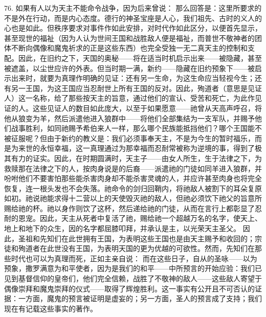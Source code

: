 76. 如果有人以为天主不能命令战争，因为后来曾说： 那么回答是：这里所要求的不是外在行动，而是内心态度。德行的神圣宝座是人心，我们祖先、古时的义人的心也是如此。但秩序要求对事件作如此安排，对时代作如此区分，以便首先显示，甚至现世的福祉（因为人认为世间王国和战胜敌人便是福祉，而普世不敬神者的团体不断向偶像和魔鬼祈求的正是这些东西）也完全受独一无二真天主的控制和支配。因此，在旧约之下，天国的奥秘——将在适当时机启示出来——被隐藏，甚至被遮盖，以尘世应许的外表。但当时期一满，新约——隐藏在旧约预象下——被启示出来时，就要为真理作明确的见证：还有另一生命，为这生命应当轻视今生；还有另一王国，为这王国应当忍耐世上所有王国的反对。因此，殉道者（意思是见证人）这一名称，给了那些按天主的旨意，通过他们的宣认、受苦和死亡，为此作见证的人。这些见证人的数目如此庞大，以至于如果愿意——祂曾从天高声呼召，将他从狼变为羊，然后派遣他进入狼群中——将他们全部集结为一支军队，并赐予他们战事胜利，如同祂赐予希伯来人一样，那么哪个民族能抵挡他们？哪个王国能不被征服呢？但由于新约的教义是：我们必须事奉天主，不是为今生的暂时福乐，而是为来世的永恒幸福，这一真理通过为那幸福而忍耐常被称为逆境的事，得到了极其有力的证实。因此，在时期圆满时，天主子——由女人所生，生于法律之下，为救赎那在法律之下的人，按肉身说是的后裔——派遣祂的门徒如同羊进入狼群，并吩咐他们不要害怕那些能杀害肉身却不能杀害灵魂的人，并应许甚至肉身也将完全恢复，连一根头发也不会失落。祂命令的剑归回鞘内，将祂敌人被割下的耳朵复原如初。祂说祂能求得十二营以上的天使毁灭祂的敌人，但祂必须饮下祂父的旨意所赐给祂的杯。祂以身作则饮了这杯，然后递给祂的门徒，从而在言行上都彰显了忍耐的恩宠。因此，天主从死者中复活了祂，赐给祂一个超越万名的名字，使天上、地上和地下的众生，因的名字都屈膝叩拜，并承认是主，以光荣天主圣父。 因此，圣祖和先知们在此世拥有王国，为表明这些王国也是由天主赐予和收回的；宗徒和殉道者在此世没有王国，为表明天国的更为优越的可欲性。然而，先知们在那些时代也可以为真理而死，正如主亲自说： 而在这些日子，自从的圣咏——以为预象，撒罗满意为和平使者，因为是我们的和平——中所预言的开始应验：我们已见到基督信仰的皇帝们，他们完全信赖，战胜了不敬神的敌人——这些敌人寄望于偶像崇拜和魔鬼崇拜的仪式——取得了辉煌胜利。这一事实有公开且不可否认的证据：一方面，魔鬼的预言被证明是虚妄的；另一方面，圣人的预言成了支持；我们现在有记载这些事实的著作。\par

